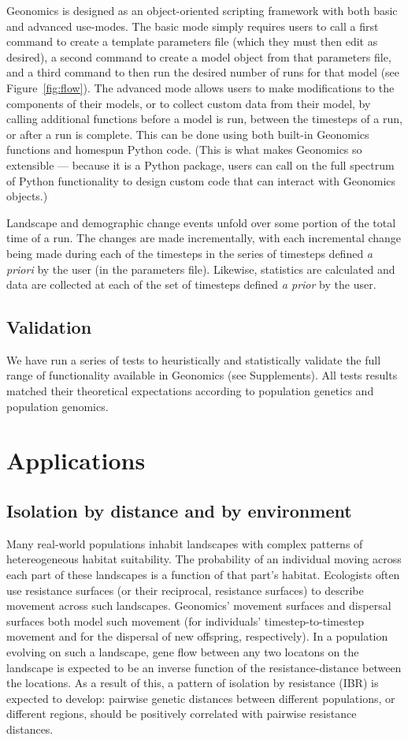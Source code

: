 ﻿\documentclass{article}
\begin{document}
Geonomics is designed as an object-oriented scripting framework with both basic and advanced use-modes.
The basic mode simply requires users to call a first command to create a template
parameters file (which they must then edit as desired), a second command to create
a model object from that parameters file, and a third command to then run the desired number
of runs for that model (see Figure~\ref{fig:flow}).
The advanced mode allows users to make modifications to the components of their models,
or to collect custom data from their model, by calling additional functions
before a model is run, between the timesteps of a run, or after a run is complete.
This can be done using both built-in Geonomics functions and homespun Python code.
(This is what makes Geonomics so extensible --- because it is a Python package, users can call on
the full spectrum of Python functionality to design custom code that can interact with Geonomics objects.)

Landscape and demographic change events unfold over some portion of the total time of a run.
The changes are made incrementally, with each incremental change being made 
during each of the timesteps in the series of timesteps defined \emph{a priori} by the user (in the parameters file).
Likewise, statistics are calculated and data are collected
at each of the set of timesteps defined \emph{a prior} by the user.


\subsection{Validation}
We have run a series of tests to heuristically and statistically validate
the full range of functionality available in Geonomics (see Supplements).
All tests results matched their theoretical expectations
according to population genetics and population genomics.


\section{Applications}

\subsection{Isolation by distance and by environment}
Many real-world populations inhabit landscapes with complex patterns
of hetereogeneous habitat suitability.
The probability of an individual moving across each part of these landscapes
is a function of that part's habitat.
Ecologists often use resistance surfaces (or their reciprocal, resistance surfaces)
to describe movement across such landscapes.
Geonomics' movement surfaces and dispersal surfaces both model such movement
(for individuals' timestep-to-timestep movement and for the dispersal of new
offspring, respectively).
In a population evolving on such a landscape, gene flow between any two locatons on the
landscape is expected to be an inverse function of the resistance-distance between the locations.
As a result of this, a pattern of isolation by resistance (IBR) is expected to develop:
pairwise genetic distances between different populations, or different regions, should be
positively correlated with pairwise resistance distances.
\end{document}
